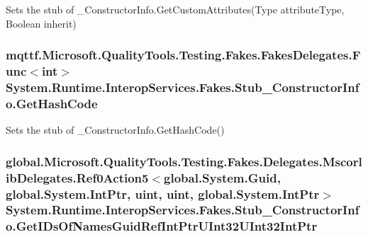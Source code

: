Sets the stub of \-\_\-\-Constructor\-Info.\-Get\-Custom\-Attributes(\-Type attribute\-Type, Boolean inherit)

\hypertarget{class_system_1_1_runtime_1_1_interop_services_1_1_fakes_1_1_stub___constructor_info_aa6af78dcd82d9820086a409c705e59f6}{
\subsubsection[{Get\-Hash\-Code}]{\setlength{\rightskip}{0pt plus 5cm}mqttf.\-Microsoft.\-Quality\-Tools.\-Testing.\-Fakes.\-Fakes\-Delegates.\-Func$<$int$>$ System.\-Runtime.\-Interop\-Services.\-Fakes.\-Stub\-\_\-\-Constructor\-Info.\-Get\-Hash\-Code}}\label{class_system_1_1_runtime_1_1_interop_services_1_1_fakes_1_1_stub___constructor_info_aa6af78dcd82d9820086a409c705e59f6}


Sets the stub of \-\_\-\-Constructor\-Info.\-Get\-Hash\-Code()

\hypertarget{class_system_1_1_runtime_1_1_interop_services_1_1_fakes_1_1_stub___constructor_info_a6fd4e3405c6146a6931ed93993303826}{
\subsubsection[{Get\-I\-Ds\-Of\-Names\-Guid\-Ref\-Int\-Ptr\-U\-Int32\-U\-Int32\-Int\-Ptr}]{\setlength{\rightskip}{0pt plus 5cm}global.\-Microsoft.\-Quality\-Tools.\-Testing.\-Fakes.\-Delegates.\-Mscorlib\-Delegates.\-Ref0\-Action5$<$global.\-System.\-Guid, global.\-System.\-Int\-Ptr, uint, uint, global.\-System.\-Int\-Ptr$>$ System.\-Runtime.\-Interop\-Services.\-Fakes.\-Stub\-\_\-\-Constructor\-Info.\-Get\-I\-Ds\-Of\-Names\-Guid\-Ref\-Int\-Ptr\-U\-Int32\-U\-Int32\-Int\-Ptr}}\label{class_system_1_1_runtime_1_1_interop_services_1_1_fakes_1_1_stub___constructor_info_a6fd4e3405c6146a6931ed93993303826}


